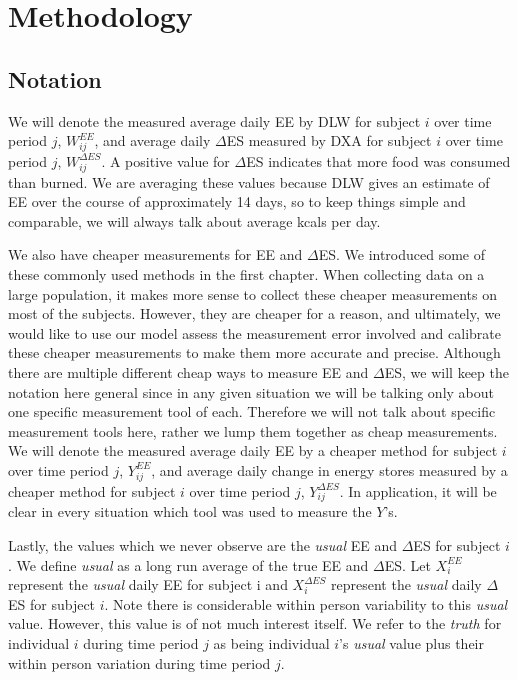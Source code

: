 \documentclass[11pt]{article}\usepackage[]{graphicx}\usepackage[]{color}
\begin{document}
\section{Methodology}


\subsection{Notation}

We will denote the measured average daily EE by DLW for subject $i$ over time period $j$, $W_{ij}^{EE}$, and average daily $\Delta$ES measured by DXA for subject $i$ over time period $j$, $W_{ij}^{\Delta ES}$. A positive value for $\Delta$ES indicates that more food was consumed than burned. We are averaging these values because DLW gives an estimate of EE over the course of approximately 14 days, so to keep things simple and comparable, we will always talk about average kcals per day. 

We also have cheaper measurements for EE and $\Delta$ES. We introduced some of these commonly used methods in the first chapter. When collecting data on a large population, it makes more sense to collect these cheaper measurements on most of the subjects. However, they are cheaper for a reason, and ultimately, we would like to use our model assess the measurement error involved and calibrate these cheaper measurements to make them more accurate and precise. Although there are multiple different cheap ways to measure EE and $\Delta$ES, we will keep the notation here general since in any given situation we will be talking only about one specific measurement tool of each. Therefore we will not talk about specific measurement tools here, rather we lump them together as cheap measurements. We will denote the measured average daily EE by a cheaper method for subject $i$ over time period $j$, $Y_{ij}^{EE}$, and average daily change in energy stores measured by a cheaper method for subject $i$ over time period $j$, $Y_{ij}^{\Delta ES}$. In application, it will be clear in every situation which tool was used to measure the $Y$'s.

Lastly, the values which we never observe are the \emph{usual} EE and $\Delta$ES for subject $i$. We define \emph{usual} as a long run average of the true EE and $\Delta$ES. Let $X_i^{EE}$ represent the \emph{usual} daily EE for subject i and $X_i^{\Delta ES}$ represent the \emph{usual} daily $\Delta$ES for subject $i$. Note there is considerable within person variability to this \emph{usual} value. However, this value is of not much interest itself. We refer to the \emph{truth} for individual $i$ during time period $j$ as being individual $i$'s \emph{usual} value plus their within person variation during time period $j$.
\end{document}
